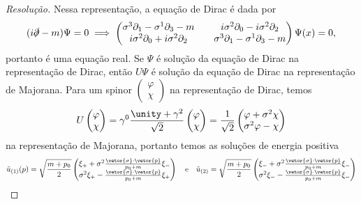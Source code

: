 \begin{proof}[Resolução]
    Nessa representação, a equação de Dirac é dada por
    \begin{equation*}
        (i \slashed{\partial} - m) \Psi = 0 \implies \begin{pmatrix}
            \sigma^3 \partial_1 - \sigma^1 \partial_3 - m && i\sigma^2 \partial_0 - i\sigma^2 \partial_2\\
            i \sigma^2 \partial_0 + i \sigma^2 \partial_2 && \sigma^3 \partial_1 - \sigma^1 \partial_3 - m
        \end{pmatrix}
        \Psi(x) = 0,
    \end{equation*}
    portanto é uma equação real. Se \(\Psi\) é solução da equação de Dirac na representação de Dirac, então \(U\Psi\) é solução da equação de Dirac na representação de Majorana. Para um spinor \((\begin{smallmatrix} \varphi\\\chi \end{smallmatrix})\) na representação de Dirac, temos
    \begin{equation*}
        U \begin{pmatrix}
            \varphi\\\chi
        \end{pmatrix} = \gamma^0\frac{\unity + \gamma^2}{\sqrt{2}} \begin{pmatrix}
            \varphi\\\chi
        \end{pmatrix} = \frac{1}{\sqrt{2}} \begin{pmatrix}
            \varphi + \sigma^2 \chi\\
            \sigma^2\varphi - \chi
        \end{pmatrix}
    \end{equation*}
    na representação de Majorana, portanto temos as soluções de energia positiva
    \begin{equation*}
        \tilde{u}_{(1)}(p) = \sqrt{\frac{m + p_0}2}  \begin{pmatrix}
            \xi_+ + \sigma^2\frac{\vetor{\sigma}\cdot\vetor{p}}{p_0 + m}\xi_- \\
            \sigma^2\xi_+ - \frac{\vetor{\sigma}\cdot\vetor{p}}{p_0 + m} \xi_+
        \end{pmatrix}
        \quad\text{e}\quad
        \tilde{u}_{(2)} = \sqrt{\frac{m + p_0}2} \begin{pmatrix}
            \xi_- + \sigma^2 \frac{\vetor{\sigma}\cdot\vetor{p}}{p_0 + m} \xi_-\\
            \sigma^2\xi_- - \frac{\vetor{\sigma}\cdot\vetor{p}}{p_0 + m} \xi_-

\end{pmatrix}
\end{equation*}
\end{proof}

